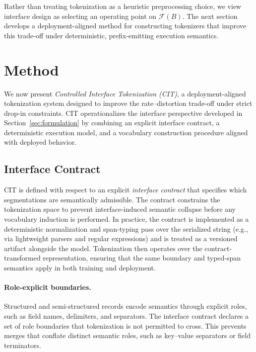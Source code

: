 Rather than treating tokenization as a heuristic preprocessing choice, we view interface design as selecting an operating point on $\mathcal{F}(B)$.
The next section develops a deployment-aligned method for constructing tokenizers that improve this trade-off under deterministic, prefix-emitting execution semantics.

\section{Method}
\label{sec:method}

We now present \emph{Controlled Interface Tokenization (CIT)}, a deployment-aligned tokenization system designed to improve the rate--distortion trade-off under strict drop-in constraints.
CIT operationalizes the interface perspective developed in Section~\ref{sec:formulation} by combining an explicit interface contract, a deterministic execution model, and a vocabulary construction procedure aligned with deployed behavior.

\subsection{Interface Contract}
\label{sec:contract}

CIT is defined with respect to an explicit \emph{interface contract} that specifies which segmentations are semantically admissible.
The contract constrains the tokenization space to prevent interface-induced semantic collapse before any vocabulary induction is performed.
In practice, the contract is implemented as a deterministic normalization and span-typing pass over the serialized string (e.g., via lightweight parsers and regular expressions) and is treated as a versioned artifact alongside the model.
Tokenization then operates over the contract-transformed representation, ensuring that the same boundary and typed-span semantics apply in both training and deployment.

\paragraph{Role-explicit boundaries.}
Structured and semi-structured records encode semantics through explicit roles, such as field names, delimiters, and separators.
The interface contract declares a set of role boundaries that tokenization is not permitted to cross.
This prevents merges that conflate distinct semantic roles, such as key--value separators or field terminators.

